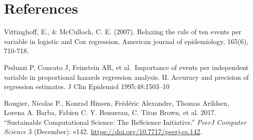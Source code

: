 \documentclass[10,a4paperpaper,]{article}
\begin{document}
\section{References}

Vittinghoff, E., \& McCulloch, C. E. (2007). Relaxing the rule of ten
events per variable in logistic and Cox regression. American journal of
epidemiology, 165(6), 710-718.

Peduzzi P, Concato J, Feinstein AR, et al.~Importance of events per
independent variable in proportional hazards regression analysis. II.
Accuracy and precision of regression estimates. J Clin Epidemiol
1995;48:1503--10

\hypertarget{refs}{}
\leavevmode\hypertarget{ref-rougier_sustainable_2017-1}{}%
Rougier, Nicolas P., Konrad Hinsen, Frédéric Alexandre, Thomas Arildsen,
Lorena A. Barba, Fabien C. Y. Benureau, C. Titus Brown, et al. 2017.
``Sustainable Computational Science: The ReScience Initiative.''
\emph{PeerJ Computer Science} 3 (December): e142.
\url{https://doi.org/10.7717/peerj-cs.142}.
\end{document}
